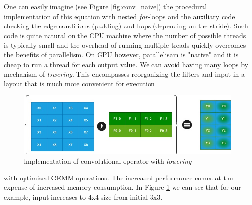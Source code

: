 \documentclass{article}
\begin{document}
One can easily imagine (see Figure \ref{fig:conv_naive}) the procedural implementation of this equation with nested \textit{for}-loops and the auxiliary code checking the edge conditions (padding) and hops (depending on the stride). Such code is quite natural on the CPU machine where the number of possible threads is typically small and the overhead of running multiple treads quickly overcomes the benefits of parallelism. On GPU however, parallelisam is "native" and it is
cheap to run a thread for each output value. We can avoid having many loops by mechanism of \textit{lowering}. This encompasses reorganizing the filters and input in a layout that is much more convenient for execution 
\begin{figure}
    \centering
    \includegraphics[scale=0.4]{ConvDiagram_Lowering.jpg}
    \caption{Implementation of convolutional operator with \textit{lowering}}
    \label{fig:conv_lowering}
\end{figure}
with optimized GEMM operations. The increased performance comes at the expense of increased memory consumption. In Figure \ref{fig:conv_lowering} we can see that for our example, input increases to 4x4 size from initial 3x3.
\end{document}
